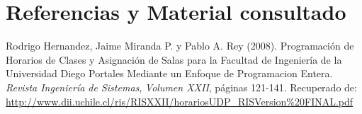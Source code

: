 \documentclass[a4paper]{article}
\begin{document}
\newpage
\section{Referencias y Material consultado}

\renewcommand\refname{\small}

\begin{thebibliography}{X}















 Rodrigo Hernandez, Jaime Miranda P. y Pablo A. Rey (2008). Programación de Horarios de Clases y Asignación de Salas para la Facultad de Ingeniería de la Universidad Diego Portales Mediante un Enfoque de Programacion Entera. \textit{Revista Ingeniería de Sistemas}, \textit{Volumen XXII}, páginas 121-141.
Recuperado de: \url{http://www.dii.uchile.cl/ris/RISXXII/horariosUDP_RISVersion%20FINAL.pdf}



\end{thebibliography}
\end{document}
